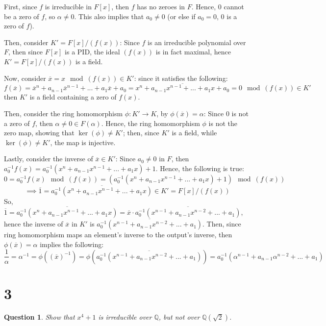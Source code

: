 \documentclass{article}
\newtheorem{question}{Question}
\begin{document}
First, since $f$ is irreducible in $F[x]$, then $f$ has no zeroes in $F$. Hence, $0$ cannot be a zero of $f$, so $\alpha\neq 0$. This also implies that $a_0\neq 0$ (or else if $a_0=0$, $0$ is a zero of $f$).

\hfil

Then, consider $K'=F[x]/(f(x))$: Since $f$ is an irreducible polynomial over $F$, then since $F[x]$ is a PID,
the ideal $(f(x))$ is in fact maximal, hence $K'=F[x]/(f(x))$ is a field.

Now, consider $\overline{x} = x\mod (f(x))\in K'$: since it satisfies the following: 
$$f(\overline{x})=\overline{x}^n+a_{n-1}\overline{x}^{n-1}+...+a_1\overline{x}+a_0 = \overline{x^n+a_{n-1}x^{n-1}+...+a_1x+a_0} = 0\mod (f(x))\in K'$$
then $K'$ is a field containing a zero of $f(x)$.

Then, consider the ring homomorphism $\phi: K'\rightarrow K$, by $\phi(\overline{x})=\alpha$: Since $0$ is not a zero of $f$, then $\alpha\neq 0\in F(\alpha)$.
Hence, the ring homomorphism $\phi$ is not the zero map, showing that $\ker(\phi)\neq K'$;
then, since $K'$ is a field, while $\ker(\phi)\neq K'$, the map is injective.

\hfil

Lastly, consider the inverse of $\overline{x}\in K'$: Since $a_0\neq 0$ in $F$, then $a_0^{-1}f(x)=a_0^{-1}(x^n+a_{n-1}x^{n-1}+...+a_1x)+1$.
Hence, the following is true:
$$0=a_0^{-1}f(x)\mod (f(x)) = (a_0^{-1}(x^n+a_{n-1}x^{n-1}+...+a_1x)+1)\mod (f(x))$$
$$\implies \overline{1}=\overline{a_0^{-1}(x^n+a_{n-1}x^{n-1}+...+a_1x)}\in K' = F[x]/(f(x))$$
So, $\overline{1}=\overline{a_0^{-1}(x^n+a_{n-1}x^{n-1}+...+a_1x)}=\overline{x}\cdot \overline{a_0^{-1}(x^{n-1}+a_{n-1}x^{n-2}+...+a_1)}$, hence the inverse of $\overline{x}$ in $K'$ is $\overline{a_0^{-1}(x^{n-1}+a_{n-1}x^{n-2}+...+a_1)}$.
Then, since ring homomorphism maps an element's inverse to the output's inverse, then $\phi(\overline{x})=\alpha$ implies the following: 
$$\frac{1}{\alpha}=\alpha^{-1}=\phi((\overline{x})^{-1})=\phi\left(\overline{a_0^{-1}(x^{n-1}+a_{n-1}x^{n-2}+...+a_1)}\right)=a_0^{-1}(\alpha^{n-1}+a_{n-1}\alpha^{n-2}+...+a_1)$$


\break

\section*{3}
\begin{myBox}[]{}
    \begin{question}
        Show that $x^4+1$ is irreducible over $\mathbb{Q}$, but not over $\mathbb{Q}(\sqrt{2})$.
    \end{question}
\end{myBox}
\end{document}
